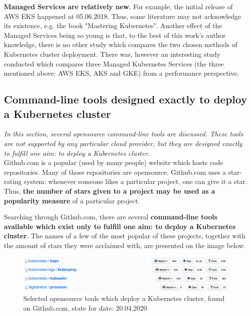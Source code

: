 \textbf{Managed Services are relatively new}. For example, the initial release of AWS EKS happened at 05.06.2018\cite{eks-history}. Thus, some literature may not acknowledge its existence, e.g. the book "Mastering Kubernetes"\cite{book-mastering-k8s}. Another effect of the Managed Services being so young is that, to the best of this work's author knowledge, there is no other study which compares the two chosen methods of Kubernetes cluster deployment. There was, however an interesting study conducted which compares three Managed Kubernetes Services (the three mentioned above: AWS EKS, AKS and GKE) from a performance perspective\cite{article-managed}.

\subsection{Command-line tools designed exactly to deploy a Kubernetes cluster}
\textit{In this section, several opensource command-line tools are discussed. These tools are not supported by any particular cloud provider, but they are designed exactly to fulfill one aim: to deploy a Kubernetes cluster.}
\\

Github.com is a popular (used by many people) website which hosts code repositories. Many of those repositories are opensource.  Github.com uses a star-rating system: whenever someone likes a particular project, one can give it a star. Thus, \textbf{the number of stars given to a project may be used as a popularity measure} of a particular project.

Searching through Github.com, there are several \textbf{command-line tools available which exist only to fulfill one aim: to deploy a Kubernetes cluster}. The names of a few of the most popular of these projects, together with the amount of stars they were acclaimed with, are presented on the image below.

\begin{figure}[H]
    \centering
    \includegraphics[width=17cm]{figures/custom-tools.png}
    \captionsetup{justification=centering,margin=2cm}
    \caption{Selected opensource tools which deploy a Kubernetes cluster, found on Github.com, state for date: 20.04.2020}
\end{figure}

